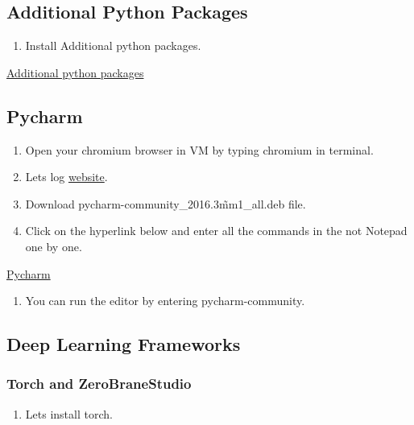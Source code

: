 \documentclass[12pt]{article}
\begin{document}
\subsection{Additional Python Packages}

\begin{enumerate}[resume]
  \item Install Additional python packages.
\end{enumerate}

\begin{center}
\href{run:./Text_Files_14/AdPP.txt}{\Large Additional python packages}
\end{center}

\subsection{Pycharm}

\begin{enumerate}[resume]
  \item Open your chromium browser in VM by typing chromium in terminal.
  \item Lets log   \href{http://ppa.launchpad.net/mystic-mirage/pycharm/ubuntu/pool/main/p/pycharm/}{website}.
  \item Download pycharm-community\_2016.3\~mm1\_all.deb file.	
  \item Click on the hyperlink below and enter all the commands in the not Notepad one by one.
\end{enumerate}

\begin{center}
\href{run:./Text_Files_14/Pycharm.txt}{\Large Pycharm}
\end{center}

\begin{enumerate}[resume]
  \item You can run the editor by entering pycharm-community.
\end{enumerate}

\subsection{Deep Learning Frameworks}

\subsubsection{Torch and ZeroBraneStudio}

\begin{enumerate}[resume]
  \item Lets install torch.
\end{enumerate}
\end{document}
